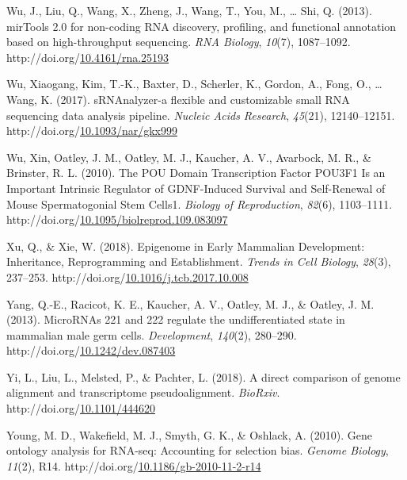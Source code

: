 \documentclass[12pt,twoside]{reedthesis}
\newlength{\cslhangindent}
\newenvironment{CSLReferences}[2] %
 {%
  \setlength{\parindent}{0pt}
  \ifodd #1 \everypar{\setlength{\hangindent}{\cslhangindent}}\ignorespaces\fi
  \ifnum #2 > 0
  \setlength{\parskip}{#2\baselineskip}
  \fi
 }%
 {}
\begin{document}
\begin{CSLReferences}{1}{0}
\leavevmode{}%
Wu, J., Liu, Q., Wang, X., Zheng, J., Wang, T., You, M., \ldots{} Shi, Q. (2013). mirTools 2.0 for non-coding RNA discovery, profiling, and functional annotation based on high-throughput sequencing. \emph{RNA Biology}, \emph{10}(7), 1087--1092. http://doi.org/\href{https://doi.org/10.4161/rna.25193}{10.4161/rna.25193}

\leavevmode{}%
Wu, Xiaogang, Kim, T.-K., Baxter, D., Scherler, K., Gordon, A., Fong, O., \ldots{} Wang, K. (2017). sRNAnalyzer-a flexible and customizable small RNA sequencing data analysis pipeline. \emph{Nucleic Acids Research}, \emph{45}(21), 12140--12151. http://doi.org/\href{https://doi.org/10.1093/nar/gkx999}{10.1093/nar/gkx999}

\leavevmode{}%
Wu, Xin, Oatley, J. M., Oatley, M. J., Kaucher, A. V., Avarbock, M. R., \& Brinster, R. L. (2010). The POU Domain Transcription Factor POU3F1 Is an Important Intrinsic Regulator of GDNF-Induced Survival and Self-Renewal of Mouse Spermatogonial Stem Cells1. \emph{Biology of Reproduction}, \emph{82}(6), 1103--1111. http://doi.org/\href{https://doi.org/10.1095/biolreprod.109.083097}{10.1095/biolreprod.109.083097}

\leavevmode{}%
Xu, Q., \& Xie, W. (2018). Epigenome in Early Mammalian Development: Inheritance, Reprogramming and Establishment. \emph{Trends in Cell Biology}, \emph{28}(3), 237--253. http://doi.org/\href{https://doi.org/10.1016/j.tcb.2017.10.008}{10.1016/j.tcb.2017.10.008}

\leavevmode{}%
Yang, Q.-E., Racicot, K. E., Kaucher, A. V., Oatley, M. J., \& Oatley, J. M. (2013). MicroRNAs 221 and 222 regulate the undifferentiated state in mammalian male germ cells. \emph{Development}, \emph{140}(2), 280--290. http://doi.org/\href{https://doi.org/10.1242/dev.087403}{10.1242/dev.087403}

\leavevmode{}%
Yi, L., Liu, L., Melsted, P., \& Pachter, L. (2018). A direct comparison of genome alignment and transcriptome pseudoalignment. \emph{BioRxiv}. http://doi.org/\href{https://doi.org/10.1101/444620}{10.1101/444620}

\leavevmode{}%
Young, M. D., Wakefield, M. J., Smyth, G. K., \& Oshlack, A. (2010). Gene ontology analysis for RNA-seq: Accounting for selection bias. \emph{Genome Biology}, \emph{11}(2), R14. http://doi.org/\href{https://doi.org/10.1186/gb-2010-11-2-r14}{10.1186/gb-2010-11-2-r14}


\end{CSLReferences}
\end{document}
